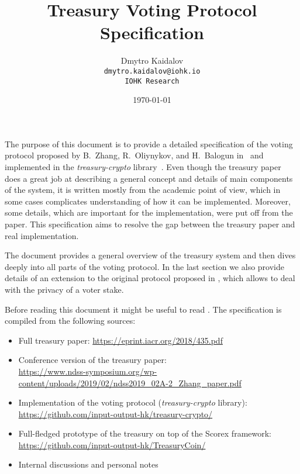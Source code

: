 \documentclass{article}
\title{Treasury Voting Protocol Specification}
\author{Dmytro Kaidalov\\
    \texttt{dmytro.kaidalov@iohk.io}\\
    \texttt{IOHK Research}}
\date{\today}
\begin{document}
\maketitle
\thispagestyle{empty}

The purpose of this document is to provide a detailed specification of the voting protocol proposed by B.~Zhang, R.~Oliynykov, and H.~Balogun in~\cite{ZOB18} and implemented in the \textit{treasury-crypto} library~\cite{treasury-crypto}. Even though the treasury paper~\cite{ZOB18} does a great job at describing a general concept and details of main components of the system, it is written mostly from the academic point of view, which in some cases complicates understanding of how it can be implemented. Moreover, some details, which are important for the implementation, were put off from the paper. This specification aims to resolve the gap between the treasury paper and real implementation.

The document provides a general overview of the treasury system and then dives deeply into all parts of the voting protocol. In the last section we also provide details of an extension to the original protocol proposed in \cite{ZBO20}, which allows to deal with the privacy of a voter stake.

Before reading this document it might be useful to read \cite{ZOB18}. 
The specification is compiled from the following sources:
\begin{itemize}
    \item Full treasury paper: \url{https://eprint.iacr.org/2018/435.pdf} \cite{ZOB18}
    \item Conference version of the treasury paper:\\ \url{https://www.ndss-symposium.org/wp-content/uploads/2019/02/ndss2019_02A-2_Zhang_paper.pdf} \cite{ZOB18NDSS}
    \item Implementation of the voting protocol (\textit{treasury-crypto} library):\\ \url{https://github.com/input-output-hk/treasury-crypto/} \cite{treasury-crypto}
    \item Full-fledged prototype of the treasury on top of the Scorex framework:\\
    \url{https://github.com/input-output-hk/TreasuryCoin/} \cite{treasurycoin}
    \item Internal discussions and personal notes
\end{itemize}

\newpage
{
  \hypersetup{linkcolor=black}
  \tableofcontents
}






\end{document}
